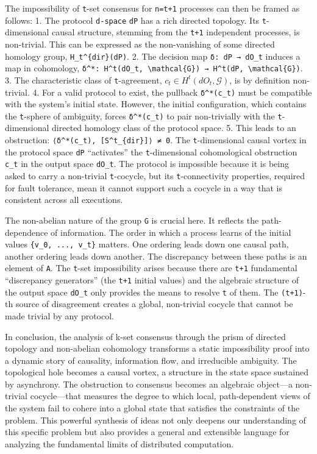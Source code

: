 \documentclass[
]{article}
\begin{document}
The impossibility of \texttt{t}-set consensus for \texttt{n=t+1}
processes can then be framed as follows: 1. The protocol
\texttt{d-space} \texttt{dP} has a rich directed topology. Its
\texttt{t}-dimensional causal structure, stemming from the \texttt{t+1}
independent processes, is non-trivial. This can be expressed as the
non-vanishing of some directed homology group,
\texttt{H\_t\^{}\{dir\}(dP)}. 2. The decision map
\texttt{δ:\ dP\ →\ dO\_t} induces a map in cohomology,
\texttt{δ\^{}*:\ H\^{}t(dO\_t,\ \textbackslash{}mathcal\{G\})\ →\ H\^{}t(dP,\ \textbackslash{}mathcal\{G\})}.
3. The characteristic class of \texttt{t}-agreement,
\(c_t \in H^t(dO_t, \mathcal{G})\), is by definition non-trivial. 4. For
a valid protocol to exist, the pullback \texttt{δ\^{}*(c\_t)} must be
compatible with the system's initial state. However, the initial
configuration, which contains the \texttt{t}-sphere of ambiguity, forces
\texttt{δ\^{}*(c\_t)} to pair non-trivially with the
\texttt{t}-dimensional directed homology class of the protocol space. 5.
This leads to an obstruction:
\texttt{⟨δ\^{}*(c\_t),\ {[}S\^{}t\_\{dir\}{]}⟩\ ≠\ 0}. The
\texttt{t}-dimensional causal vortex in the protocol space \texttt{dP}
``activates'' the \texttt{t}-dimensional cohomological obstruction
\texttt{c\_t} in the output space \texttt{dO\_t}. The protocol is
impossible because it is being asked to carry a non-trivial
\texttt{t}-cocycle, but its \texttt{t}-connectivity properties, required
for fault tolerance, mean it cannot support such a cocycle in a way that
is consistent across all executions.

The non-abelian nature of the group \texttt{G} is crucial here. It
reflects the path-dependence of information. The order in which a
process learns of the initial values \texttt{\{v\_0,\ ...,\ v\_t\}}
matters. One ordering leads down one causal path, another ordering leads
down another. The discrepancy between these paths is an element of
\texttt{A}. The \texttt{t}-set impossibility arises because there are
\texttt{t+1} fundamental ``discrepancy generators'' (the \texttt{t+1}
initial values) and the algebraic structure of the output space
\texttt{dO\_t} only provides the means to resolve \texttt{t} of them.
The \texttt{(t+1)}-th source of disagreement creates a global,
non-trivial cocycle that cannot be made trivial by any protocol.

In conclusion, the analysis of k-set consensus through the prism of
directed topology and non-abelian cohomology transforms a static
impossibility proof into a dynamic story of causality, information flow,
and irreducible ambiguity. The topological hole becomes a causal vortex,
a structure in the state space sustained by asynchrony. The obstruction
to consensus becomes an algebraic object---a non-trivial cocycle---that
measures the degree to which local, path-dependent views of the system
fail to cohere into a global state that satisfies the constraints of the
problem. This powerful synthesis of ideas not only deepens our
understanding of this specific problem but also provides a general and
extensible language for analyzing the fundamental limits of distributed
computation.
\end{document}
